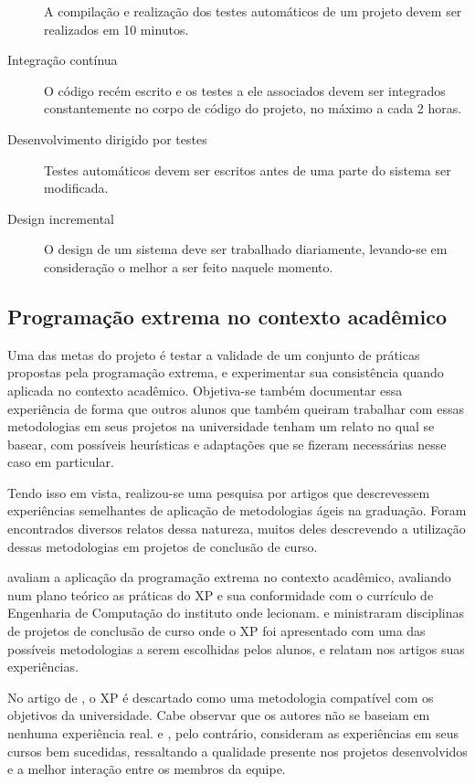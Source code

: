 \begin{description}
      A compilação e realização dos testes automáticos de um projeto devem ser realizados em 10 minutos.
      \item[Integração contínua]
      O código recém escrito e os testes a ele associados devem ser integrados constantemente no corpo de código do projeto, no máximo a cada 2 horas.
      \item[Desenvolvimento dirigido por testes]
      Testes automáticos devem ser escritos antes de uma parte do sistema ser modificada.
      \item[Design incremental]
      O design de um sistema deve ser trabalhado diariamente, levando-se em consideração o melhor a ser feito naquele momento.
    \end{description}

	\subsection{Programação extrema no contexto acadêmico}\label{xp_e_universidade}
    Uma das metas do projeto é testar a validade de um conjunto de práticas propostas pela programação extrema, e experimentar sua consistência quando aplicada no contexto acadêmico. Objetiva-se também documentar essa experiência de forma que outros alunos que também queiram trabalhar com essas metodologias em seus projetos na universidade tenham um relato no qual se basear, com possíveis heurísticas e adaptações que se fizeram necessárias nesse caso em particular.

    Tendo isso em vista, realizou-se uma pesquisa por artigos que descrevessem experiências semelhantes de aplicação de metodologias ágeis na graduação. Foram encontrados diversos relatos dessa natureza, muitos deles descrevendo a utilização dessas metodologias em projetos de conclusão de curso.

     avaliam a aplicação da programação extrema no contexto acadêmico, avaliando num plano teórico as práticas do XP e sua conformidade com o currículo de Engenharia de Computação do instituto onde lecionam.  e  ministraram disciplinas de projetos de conclusão de curso onde o XP foi apresentado com uma das possíveis metodologias a serem escolhidas pelos alunos, e relatam nos artigos suas experiências.

    No artigo de , o XP é descartado como uma metodologia compatível com os objetivos da universidade. Cabe observar que os autores não se baseiam em nenhuma experiência real.  e , pelo contrário, consideram as experiências em seus cursos bem sucedidas, ressaltando a qualidade presente nos projetos desenvolvidos e a melhor interação entre os membros da equipe.

